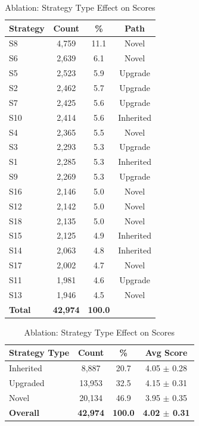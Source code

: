 \documentclass[11pt]{article}
\begin{document}
\begin{table}[t]
\begin{table}[t]
\centering
\caption{Strategy Usage Distribution (42,974 annotations)}
\label{tab:strategy_distribution}
\begin{tabular}{lccc}
\toprule
\textbf{Strategy} & \textbf{Count} & \textbf{\%} & \textbf{Path} \\
\midrule
S8 & 4,759 & 11.1 & Novel \\
S6 & 2,639 & 6.1 & Novel \\
S5 & 2,523 & 5.9 & Upgrade \\
S2 & 2,462 & 5.7 & Upgrade \\
S7 & 2,425 & 5.6 & Upgrade \\
S10 & 2,414 & 5.6 & Inherited \\
S4 & 2,365 & 5.5 & Novel \\
S3 & 2,293 & 5.3 & Upgrade \\
S1 & 2,285 & 5.3 & Inherited \\
S9 & 2,269 & 5.3 & Upgrade \\
S16 & 2,146 & 5.0 & Novel \\
S12 & 2,142 & 5.0 & Novel \\
S18 & 2,135 & 5.0 & Novel \\
S15 & 2,125 & 4.9 & Inherited \\
S14 & 2,063 & 4.8 & Inherited \\
S17 & 2,002 & 4.7 & Novel \\
S11 & 1,981 & 4.6 & Upgrade \\
S13 & 1,946 & 4.5 & Novel \\
\midrule
\textbf{Total} & \textbf{42,974} & \textbf{100.0} & \\
\bottomrule
\end{tabular}
\end{table}

\begin{table}[t]
\centering
\caption{Ablation: Strategy Type Effect on Scores}
\label{tab:ablation}
\begin{tabular}{lccc}
\toprule
\textbf{Strategy Type} & \textbf{Count} & \textbf{\%} & \textbf{Avg Score} \\
\midrule
Inherited & 8,887 & 20.7 & 4.05 $\pm$ 0.28 \\
Upgraded & 13,953 & 32.5 & 4.15 $\pm$ 0.31 \\
Novel & 20,134 & 46.9 & 3.95 $\pm$ 0.35 \\
\midrule
\textbf{Overall} & \textbf{42,974} & \textbf{100.0} & \textbf{4.02 $\pm$ 0.31} \\
\bottomrule
\end{tabular}
\end{table}


\end{table}
\end{document}
